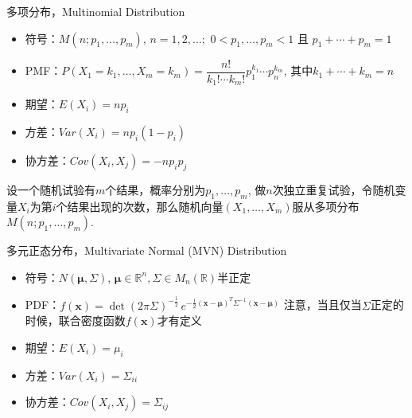 
\begin{frame}

\begin{block}{多项分布，Multinomial Distribution}
\begin{itemize}
\item 符号：$M(n;p_1,\ldots,p_m)$, \newline
$n = 1,2,\ldots;$ $0 < p_1,\ldots,p_m < 1$ 且 $p_1+\cdots+p_m = 1$
\item PMF：$P(X_1=k_1,\ldots,X_m=k_m) = \dfrac{n!}{k_1!\cdots k_m!} p_1^{k_1}\cdots p_n^{k_m}$, \newline
其中$k_1+\cdots+k_m = n$
\item 期望：$E(X_i) = np_i$
\item 方差：$Var(X_i) = np_i(1-p_i)$
\item 协方差：$Cov(X_i,X_j) = -np_ip_j$
\end{itemize}
\end{block}

\vspace{1em}
\pause

设一个随机试验有$m$个结果，概率分别为$p_1,\ldots,p_m$, 做$n$次独立重复试验，令随机变量$X_i$为第$i$个结果出现的次数，那么随机向量$(X_1,\ldots,X_m)$服从多项分布$M(n;p_1,\ldots,p_m)$.

\end{frame}


\begin{frame}

\begin{block}{多元正态分布，Multivariate Normal (MVN) Distribution}
\begin{itemize}
\item 符号：$N(\boldsymbol\mu, \Sigma)$, \; $\boldsymbol\mu \in \mathbb{R}^n, \Sigma \in M_n(\mathbb{R})$半正定
\item PDF：$f(\mathbf{x}) = \det(2\pi \Sigma )^{-{\frac {1}{2}}}\,e^{-{\frac {1}{2}}(\mathbf {x} -{\boldsymbol {\mu }})^T \Sigma^{-1}(\mathbf {x} -{\boldsymbol {\mu }})}$ \newline
注意，当且仅当$\Sigma$正定的时候，联合密度函数$f(\mathbf{x})$才有定义
\item 期望：$E(X_i) = \mu_i$
\item 方差：$Var(X_i) = \Sigma_{ii}$
\item 协方差：$Cov(X_i,X_j) = \Sigma_{ij}$
\end{itemize}
\end{block}

\end{frame}

